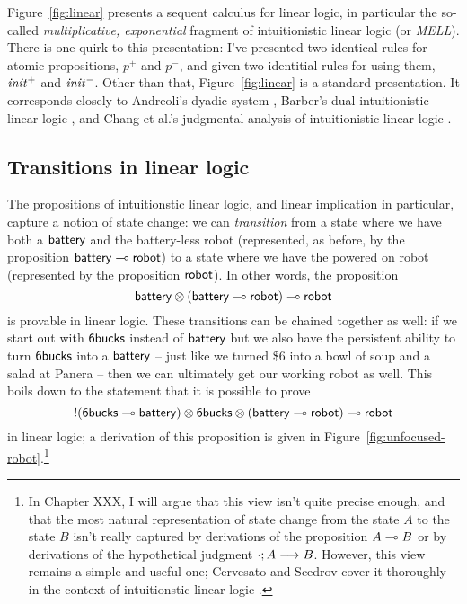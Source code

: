 

Figure~\ref{fig:linear} presents a sequent calculus for linear logic,
in particular the so-called {\it multiplicative, exponential} fragment
of intuitionistic linear logic (or {\it MELL}). There is one quirk to
this presentation: I've presented two identical rules for atomic
propositions, $p^+$ and $p^-$, and given two identitial rules for
using them, ${\it init}^+$ and ${\it init}^-$. Other than that,
Figure~\ref{fig:linear} is a standard presentation. It corresponds
closely to Andreoli's dyadic system \cite{andreoli92logic}, Barber's
dual intuitionistic linear logic \cite{barber96dual}, and Chang et
al.'s judgmental analysis of intuitionistic linear logic
\cite{chang03judgmental}.

\subsection*{Transitions in linear logic}

The propositions of intuitionstic linear logic, and linear implication
in particular, capture a notion of state change: we can {\it
  transition} from a state where we have both a ${\sf battery}$ and
the battery-less robot (represented, as before, by the proposition
${\sf battery} \multimap {\sf robot}$) to a state where we have the
powered on robot (represented by the proposition ${\sf robot}$). In
other words, the proposition
%
\[{\sf battery} \otimes ({\sf battery} \multimap {\sf robot}) \multimap
{\sf robot}\] 
%
is provable in linear logic. These transitions can be chained
together as well: if we start out with ${\sf
  6bucks}$ instead of ${\sf battery}$ but we also have the
persistent ability to turn ${\sf 6bucks}$ into a ${\sf battery}$ --
just like we turned \$6 into a bowl of soup and a salad at Panera --
then we can ultimately get our working robot as well. This boils down
to the statement that it is possible to prove
\[{!}({\sf 6bucks} \multimap {\sf battery}) \otimes {\sf 6bucks}
\otimes ({\sf battery} \multimap {\sf robot}) \multimap {\sf robot}\] in
linear logic; a derivation of this proposition is given in
Figure~\ref{fig:unfocused-robot}.\footnote{In Chapter XXX, I will
  argue that this view isn't quite precise enough, and that the most
  natural representation of state change from the state $A$ to the
  state $B$ isn't really captured by derivations of the proposition $A
  \multimap B$ or by derivations of the hypothetical judgment
  ${\cdot};{A} \longrightarrow {B} \mathstrut$.  However, this view remains a simple and useful
  one; Cervesato and Scedrov cover it thoroughly in the context of
  intuitionstic linear logic \cite{cervesato09relating}.}


